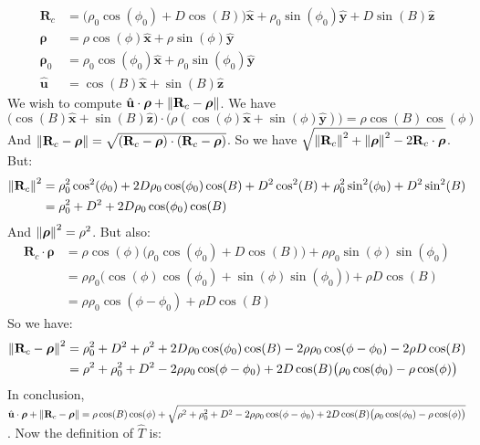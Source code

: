\documentclass{article}
\theoremstyle{mystyle}
\begin{document}
\begin{align}
\mathbf{R}_{c} &= \big(\rho_{0}\cos(\phi_0)+D\cos(B)\big)\hat{\mathbf{x}}+\rho_{0}\sin(\phi_{0})\hat{\mathbf{y}}+D\sin(B)\hat{\mathbf{z}}\\
\boldsymbol{\rho} &= \rho\cos(\phi)\hat{\mathbf{x}}+\rho\sin(\phi)\hat{\mathbf{y}}\\
\boldsymbol{\rho}_{0} &= \rho_{0}\cos(\phi_0)\hat{\mathbf{x}}+\rho_{0}\sin(\phi_{0})\hat{\mathbf{y}}\\
\hat{\mathbf{u}} &= \cos(B)\hat{\mathbf{x}}+\sin(B)\hat{\mathbf{z}}
\end{align}
We wish to compute $\hat{\mathbf{u}}\cdot \boldsymbol{\rho}+\norm{\mathbf{R}_{c}-\boldsymbol{\rho}}$. We have
\begin{equation}
\big(\cos(B)\hat{\mathbf{x}}+\sin(B)\hat{\mathbf{z}}\big)\cdot\big(\rho(\cos(\phi)\hat{\mathbf{x}}+\sin(\phi)\hat{\mathbf{y}})\big) = \rho\cos(B)\cos(\phi)
\end{equation}
And $\norm{\mathbf{R}_{c}-\boldsymbol{\rho}} = \sqrt{(\mathbf{R}_{c}-\boldsymbol{\rho})\cdot(\mathbf{R}_{c}-\boldsymbol{\rho})}$. So we have $\sqrt{\norm{\mathbf{R}_{c}}^2+\norm{\boldsymbol{\rho}}^2-2\mathbf{R}_{c}\cdot\boldsymbol{\rho}}$. But:
\begin{align}
\nonumber \norm{\mathbf{R}_{c}}^2 &= \rho_{0}^2\cos^2(\phi_0)+2D\rho_{0}\cos(\phi_0)\cos(B)+D^2\cos^2(B) + \rho_{0}^2\sin^2(\phi_0)+D^2\sin^2(B) \\
&= \rho_{0}^2+D^2+2D\rho_{0}\cos(\phi_0)\cos(B)
\end{align}
And $\norm{\boldsymbol{\rho}}^2 = \rho^2$. But also:
\begin{align}
\nonumber \mathbf{R}_{c}\cdot \boldsymbol{\rho} &= \rho\cos(\phi)\big(\rho_{0}\cos(\phi_{0})+D\cos(B)\big)+\rho\rho_{0}\sin(\phi)\sin(\phi_{0})\\
\nonumber &= \rho\rho_{0}\big(\cos(\phi)\cos(\phi_{0})+\sin(\phi)\sin(\phi_{0})\big)+\rho D\cos(B)\\
&= \rho\rho_{0}\cos(\phi-\phi_{0})+\rho D\cos(B)
\end{align}
So we have:
\begin{align}
\nonumber \norm{\mathbf{R}_{c}-\boldsymbol{\rho}}^2 &= \rho_{0}^2+D^2+\rho^2+2D\rho_{0}\cos(\phi_{0})\cos(B)-2\rho\rho_{0}\cos(\phi-\phi_{0})-2\rho D\cos(B)\\
&=\rho^2+\rho_{0}^2+D^2-2\rho\rho_{0}\cos(\phi-\phi_{0}) + 2D\cos(B)\big(\rho_{0}\cos(\phi_0)-\rho\cos(\phi)\big)
\end{align}
In conclusion, $\hat{\mathbf{u}}\cdot \boldsymbol{\rho} + \norm{\mathbf{R}_{c}-\boldsymbol{\rho}} = \rho\cos(B)\cos(\phi) + \sqrt{\rho^2+\rho_{0}^2 + D^2 - 2\rho\rho_{0}\cos(\phi - \phi_{0}) + 2D\cos(B)\big(\rho_{0}\cos(\phi_0) - \rho\cos(\phi)\big)}$. Now the definition of $\hat{T}$ is:
\end{document}
